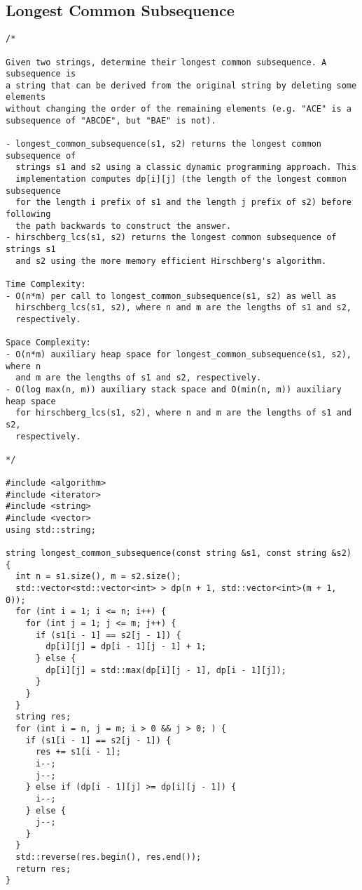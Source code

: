 \subsection{Longest Common Subsequence}
\begin{lstlisting}
/*

Given two strings, determine their longest common subsequence. A subsequence is
a string that can be derived from the original string by deleting some elements
without changing the order of the remaining elements (e.g. "ACE" is a
subsequence of "ABCDE", but "BAE" is not).

- longest_common_subsequence(s1, s2) returns the longest common subsequence of
  strings s1 and s2 using a classic dynamic programming approach. This
  implementation computes dp[i][j] (the length of the longest common subsequence
  for the length i prefix of s1 and the length j prefix of s2) before following
  the path backwards to construct the answer.
- hirschberg_lcs(s1, s2) returns the longest common subsequence of strings s1
  and s2 using the more memory efficient Hirschberg's algorithm.

Time Complexity:
- O(n*m) per call to longest_common_subsequence(s1, s2) as well as
  hirschberg_lcs(s1, s2), where n and m are the lengths of s1 and s2,
  respectively.

Space Complexity:
- O(n*m) auxiliary heap space for longest_common_subsequence(s1, s2), where n
  and m are the lengths of s1 and s2, respectively.
- O(log max(n, m)) auxiliary stack space and O(min(n, m)) auxiliary heap space
  for hirschberg_lcs(s1, s2), where n and m are the lengths of s1 and s2,
  respectively.

*/

#include <algorithm>
#include <iterator>
#include <string>
#include <vector>
using std::string;

string longest_common_subsequence(const string &s1, const string &s2) {
  int n = s1.size(), m = s2.size();
  std::vector<std::vector<int> > dp(n + 1, std::vector<int>(m + 1, 0));
  for (int i = 1; i <= n; i++) {
    for (int j = 1; j <= m; j++) {
      if (s1[i - 1] == s2[j - 1]) {
        dp[i][j] = dp[i - 1][j - 1] + 1;
      } else {
        dp[i][j] = std::max(dp[i][j - 1], dp[i - 1][j]);
      }
    }
  }
  string res;
  for (int i = n, j = m; i > 0 && j > 0; ) {
    if (s1[i - 1] == s2[j - 1]) {
      res += s1[i - 1];
      i--;
      j--;
    } else if (dp[i - 1][j] >= dp[i][j - 1]) {
      i--;
    } else {
      j--;
    }
  }
  std::reverse(res.begin(), res.end());
  return res;
}


\end{lstlisting}
